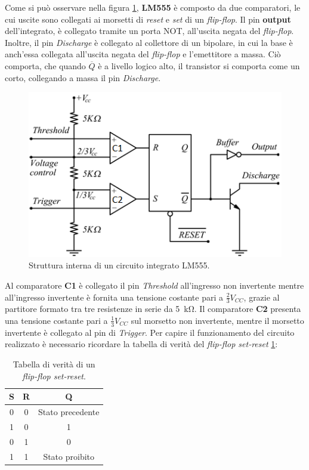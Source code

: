 \noindent
Come si può osservare nella figura \ref{fig:555_internals}, \textbf{LM555} è composto da due comparatori, le cui uscite sono collegati ai morsetti di \textit{reset} e \textit{set} di un \textit{flip-flop}. Il pin \textbf{output} dell'integrato, è collegato tramite un porta NOT, all'uscita negata del \textit{flip-flop}. Inoltre, il pin \textit{Discharge} è collegato al collettore di un bipolare, in cui la base è anch'essa collegata all'uscita negata del \textit{flip-flop} e l'emettitore a massa. Ciò comporta, che quando \textbf{$\overline{Q}$} è a livello logico alto, il transistor si comporta come un corto, collegando a massa il pin \textit{Discharge}. 

\begin{figure}[h!]
	\centering
	\includegraphics[width=0.6\linewidth]{./ImageFiles/Laboratorio 4/555internals.jpg}
	\caption{Struttura interna di un circuito integrato LM555.}
	\label{fig:555_internals}
\end{figure}

\noindent
Al comparatore \textbf{C1} è collegato il pin \textit{Threshold} all'ingresso non invertente mentre all'ingresso invertente è fornita una tensione costante pari a $\frac{2}{3}V_{CC}$, grazie al partitore formato tra tre resistenze in serie da \SI{5}{\kilo\ohm}. Il comparatore \textbf{C2} presenta una tensione costante pari a $\frac{1}{3}V_{CC}$ sul morsetto non invertente, mentre il morsetto invertente è collegato al pin di \textit{Trigger}.
Per capire il funzionamento del circuito realizzato è necessario ricordare la tabella di verità del \textit{flip-flop set-reset} \ref{tab:flip_flop_states}:

\def\arraystretch{1.3}
\begin{table}[h!]
	\centering
	\begin{tabular}{|c|c|c|}
		\hline
		S	& R & Q \\ \hline
		0 & 0 & Stato precedente  \\ \hline
		1 & 0 & 1\\ \hline
		0 & 1 & 0\\ \hline
		1 & 1 & Stato proibito \\ \hline
	\end{tabular}
	\caption{Tabella di verità di un \textit{flip-flop set-reset}.}
	\label{tab:flip_flop_states}
\end{table}

